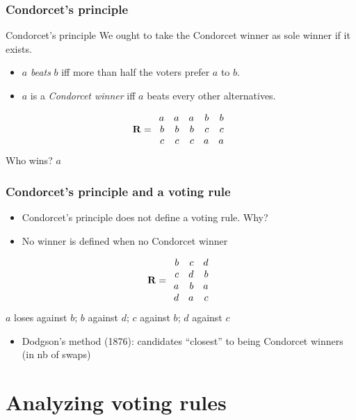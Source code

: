 \documentclass[french,english]{beamer}
\begin{document}
\begin{frame}
	\frametitle{Condorcet’s principle}
	\begin{block}{Condorcet’s principle}
		We ought to take the Condorcet winner as sole winner if it exists.
		\begin{itemize}
			\item $a$ \emph{beats} $b$ iff more than half the voters prefer $a$ to $b$.
			\item $a$ is a \emph{Condorcet winner} iff $a$ beats every other alternatives.
		\end{itemize}
	\end{block}
	\vfill
	\begin{equation}
		\mathbf{R} =
		\begin{array}{rrrrr}
			a	&	a	&	a	&	b	&	b\\
			b	&	b	&	b	&	c	&	c\\
			c	&	c	&	c	&	a	&	a
		\end{array}
	\end{equation}
	 Who wins? \pause $a$
\end{frame}

\begin{frame}
	\frametitle{Condorcet’s principle and a voting rule}
	\begin{itemize}
		\item Condorcet’s principle does not define a voting rule. Why? \pause
		\item No winner is defined when no Condorcet winner
	\end{itemize}
	\begin{equation}
		\mathbf{R} =
		\begin{array}{rrr}
			b	&	c	&	d\\
			c	&	d	&	b\\
			a	&	b	&	a\\
			d	&	a	&	c
		\end{array}
	\end{equation}
	\pause
	$a$ loses against $b$; $b$ against $d$; $c$ against $b$; $d$ against $c$
	\begin{itemize}
		\item Dodgson’s method (1876): candidates “closest” to being Condorcet winners {\tiny (in nb of swaps)}
	\end{itemize}
\end{frame}

\section{Analyzing voting rules}
\end{document}
